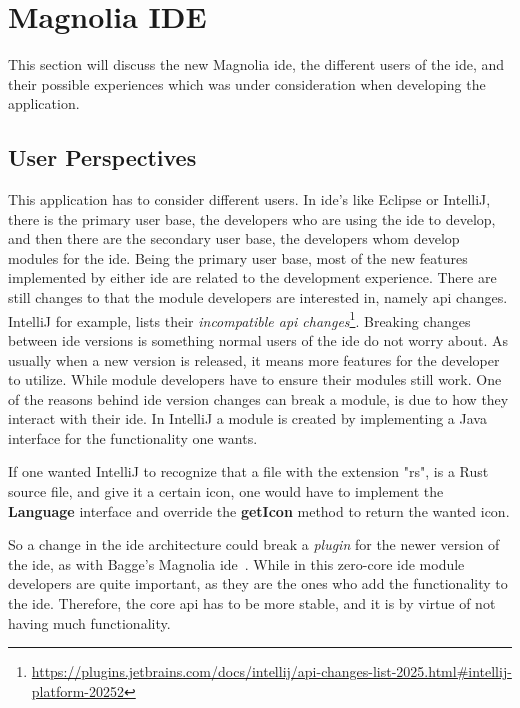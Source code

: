 \chapter{Magnolia IDE} \label{cha:ide}

This section will discuss the new Magnolia \gls*{ide}, the different users of the
\gls*{ide}, and their possible experiences which was under consideration when
developing the application.

\section{User Perspectives}

This application has to consider different users. In \gls*{ide}'s like
Eclipse or IntelliJ, there is the primary user base, the developers
who are using the \gls*{ide} to develop, and then there are the secondary user
base, the developers whom develop modules for the \gls*{ide}. Being the
primary user base, most of the new features implemented by either \gls*{ide} are
related to the development experience. There are still changes to that the
module developers are interested in, namely \gls*{api} changes.
IntelliJ for example, lists their \textit{incompatible \gls*{api} changes}\footnote{\url{https://plugins.jetbrains.com/docs/intellij/api-changes-list-2025.html\#intellij-platform-20252}}.
Breaking changes between \gls*{ide} versions is something normal users of the
\gls*{ide} do not worry about. As usually when a new version is released, it
means more features for the developer to utilize. While module
developers have to ensure their modules still work. One of the reasons
behind \gls*{ide} version changes can break a module, is due to how
they interact with their \gls*{ide}. In IntelliJ a module is
created by implementing a Java interface for the functionality one wants.

If one wanted IntelliJ to recognize that a file with the extension "rs",
is a Rust source file, and give it a certain icon, one would have to implement
the \textbf{Language} interface and override the \textbf{getIcon} method to
return the wanted icon.

So a change in the \gls*{ide} architecture could break a \textit{plugin} for the
newer version of the \gls*{ide}, as with Bagge's Magnolia \gls*{ide}~\cite{baggeIde}.
While in this zero-core \gls*{ide} module developers are quite important, as they
are the ones who add the functionality to the \gls*{ide}. Therefore, the core
\gls*{api} has to be more stable, and it is by virtue of not having much
functionality.


